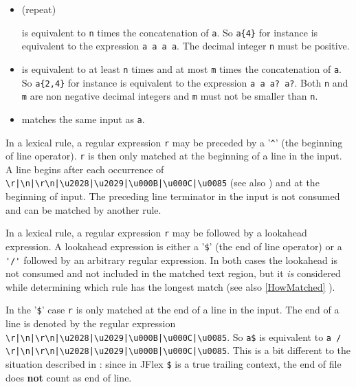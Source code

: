 \documentclass[11pt]{scrartcl}
\newcommand{\bl}{\latex{\symbol{123}}\html{\{}}
\newcommand{\br}{\latex{\symbol{125}}\html{\}}}
\newcommand{\trit}{\em}
\begin{document}
\begin{itemize}
          \item[\texttt{a\bl n\br}] (repeat)          

            is equivalent to \texttt{n} times the concatenation of \texttt{a}.
            So \verb+a{4}+ for instance is equivalent to the expression \texttt{a a a a}.
            The decimal integer \texttt{n} must be positive.          
          
          \item[\texttt{a\bl n,m\br}]          
            is equivalent to at least \texttt{n} times and at most \texttt{m} times the 
            concatenation of \texttt{a}. So \verb+a{2,4}+ for instance is equivalent 
            to the expression \verb+a a a? a?+. Both \texttt{n} and \texttt{m} are non
            negative decimal integers and \texttt{m} must not be smaller than \texttt{n}.
          
          \item[\texttt{( a )}]
            matches the same input as \texttt{a}.
            
        
\end{itemize}
    
In a lexical rule, a regular expression \texttt{r} may be preceded by a
'\verb+^+' (the beginning of line operator). \texttt{r} is then
only matched at the beginning of a line in the input. A line begins
after each occurrence of \verb+\r|\n|\r\n|\u2028|\u2029|\u000B|\u000C|\u0085+ 
(see also \cite{unicode_rep}) and at the beginning of input.  
The preceding line terminator in the input is not consumed and can 
be matched by another rule.

In a lexical rule, a regular expression \texttt{r} may be followed by a
lookahead expression. A lookahead expression is either a '\texttt{\$}'
(the end of line operator) or a \verb+'/'+ followed by an arbitrary
regular expression. In both cases the lookahead is not consumed and
not included in the matched text region, but it {\trit is} considered
while determining which rule has the longest match (see also 
\ref{HowMatched} ).

In the '\texttt{\$}' case \texttt{r} is only matched at the end of a line in
the input. The end of a line is denoted by the regular expression
\verb+\r|\n|\r\n|\u2028|\u2029|\u000B|\u000C|\u0085+. 
So \verb+a$+ is equivalent to \verb+a / \r|\n|\r\n|\u2028|\u2029|\u000B|\u000C|\u0085+.%
This is a bit different to the situation described in \cite{unicode_rep}:
since in JFlex \verb+$+ is a true trailing context, the end of file
does {\bf not} count as end of line.
\end{document}
